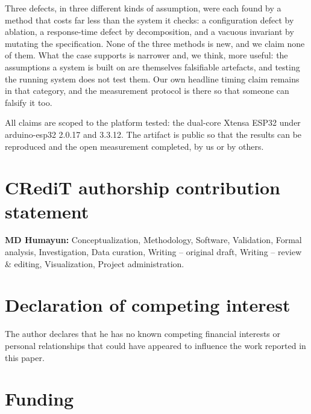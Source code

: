 Three defects, in three different kinds of assumption, were each found by a method that costs
far less than the system it checks: a configuration defect by ablation, a response-time defect
by decomposition, and a vacuous invariant by mutating the specification. None of the three
methods is new, and we claim none of them. What the case supports is narrower and, we think,
more useful: the assumptions a system is built on are themselves falsifiable artefacts, and
testing the running system does not test them. Our own headline timing claim remains in that
category, and the measurement protocol is there so that someone can falsify it too.

All claims are scoped to the platform tested: the dual-core Xtensa ESP32 under arduino-esp32
2.0.17 and 3.3.12. The artifact is public so that the results can be reproduced and the open
measurement completed, by us or by others.

%

\section*{CRediT authorship contribution statement}

\noindent\textbf{MD Humayun:} Conceptualization, Methodology, Software, Validation, Formal
analysis, Investigation, Data curation, Writing -- original draft, Writing -- review \&
editing, Visualization, Project administration.

\section*{Declaration of competing interest}

\noindent The author declares that he has no known competing financial interests or personal
relationships that could have appeared to influence the work reported in this paper.

\section*{Funding}

